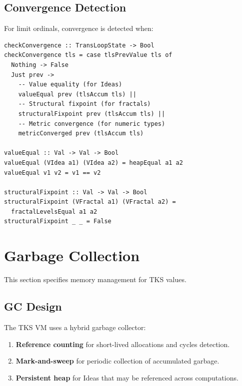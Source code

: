 \subsection{Convergence Detection}
\label{subsec:convergence-detection}

\begin{definition}
\label{def:convergence-criteria}
For limit ordinals, convergence is detected when:
\begin{verbatim}
checkConvergence :: TransLoopState -> Bool
checkConvergence tls = case tlsPrevValue tls of
  Nothing -> False
  Just prev ->
    -- Value equality (for Ideas)
    valueEqual prev (tlsAccum tls) ||
    -- Structural fixpoint (for fractals)
    structuralFixpoint prev (tlsAccum tls) ||
    -- Metric convergence (for numeric types)
    metricConverged prev (tlsAccum tls)

valueEqual :: Val -> Val -> Bool
valueEqual (VIdea a1) (VIdea a2) = heapEqual a1 a2
valueEqual v1 v2 = v1 == v2

structuralFixpoint :: Val -> Val -> Bool
structuralFixpoint (VFractal a1) (VFractal a2) =
  fractalLevelsEqual a1 a2
structuralFixpoint _ _ = False
\end{verbatim}
\end{definition}

\section{Garbage Collection}
\label{sec:garbage-collection}

This section specifies memory management for TKS values.

\subsection{GC Design}
\label{subsec:gc-design}

\begin{definition}
\label{def:gc-strategy}
The TKS VM uses a hybrid garbage collector:
\begin{enumerate}
  \item \textbf{Reference counting} for short-lived allocations and cycles detection.
  \item \textbf{Mark-and-sweep} for periodic collection of accumulated garbage.
  \item \textbf{Persistent heap} for Ideas that may be referenced across computations.
\end{enumerate}
\end{definition}

